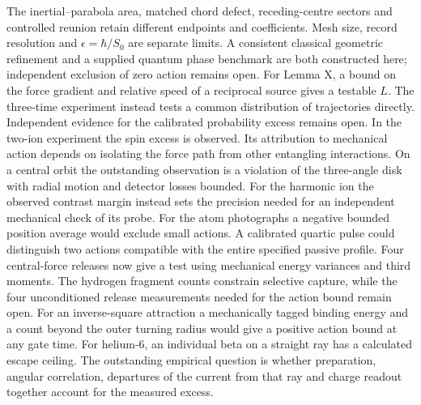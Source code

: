 \documentclass[11pt,a4paper]{article}
\begin{document}
The inertial--parabola area, matched chord defect, receding-centre
sectors and controlled reunion retain different endpoints and
coefficients. Mesh size, record resolution and \(\epsilon=\hbar/S_0\)
are separate limits. A consistent classical geometric refinement and a
supplied quantum phase benchmark are both constructed here; independent
exclusion of zero action remains open. For Lemma X, a bound on the force
gradient and relative speed of a reciprocal source gives a testable
\(L\). The three-time experiment instead tests a common distribution of
trajectories directly. Independent evidence for the calibrated
probability excess remains open. In the two-ion experiment the spin
excess is observed. Its attribution to mechanical action depends on
isolating the force path from other entangling interactions. On a
central orbit the outstanding observation is a violation of the
three-angle disk with radial motion and detector losses bounded. For the
harmonic ion the observed contrast margin instead sets the precision
needed for an independent mechanical check of its probe. For the atom
photographs a negative bounded position average would exclude small
actions. A calibrated quartic pulse could distinguish two actions
compatible with the entire specified passive profile. Four central-force
releases now give a test using mechanical energy variances and third
moments. The hydrogen fragment counts constrain selective capture, while
the four unconditioned release measurements needed for the action bound
remain open. For an inverse-square attraction a mechanically tagged
binding energy and a count beyond the outer turning radius would give a
positive action bound at any gate time. For helium-6, an individual beta
on a straight ray has a calculated escape ceiling. The outstanding
empirical question is whether preparation, angular correlation,
departures of the current from that ray and charge readout together
account for the measured excess.
\end{document}
